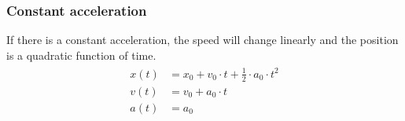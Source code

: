 \documentclass[10pt,a4paper,twoside]{article}
\begin{document}
\subsubsection{Constant acceleration}
If there is a constant acceleration, the speed will change linearly and the position is a quadratic function of time.
\begin{align*}
  \begin{split}
    x(t) & = x_0 + v_0 \cdot t + \frac{1}{2} \cdot a_0 \cdot t^2\\
    v(t) & = v_0 + a_0 \cdot t\\
    a(t) & = a_0
  \end{split}
\end{align*}



\end{document}

